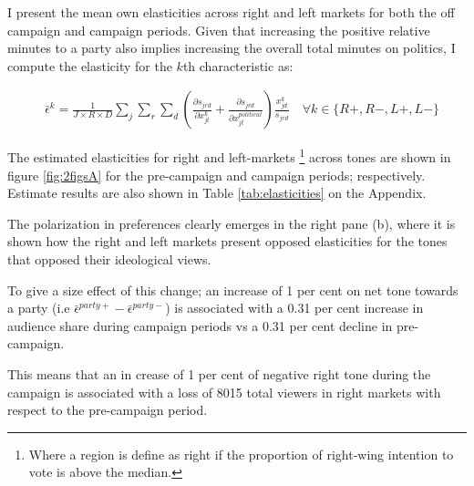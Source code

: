 \documentclass[12pt]{article}
\begin{document}
	I present the mean own elasticities across right and left markets for both the off campaign and campaign periods.  Given that increasing the positive relative minutes to a party also implies increasing the overall total minutes on politics, I compute the elasticity for the $k$th characteristic as: 
	
	\begin{equation}\label{eq:elasticities}
		\begin{aligned}
			& \bar{\epsilon}^k= \frac{1}{J\times R \times D}\sum_{j}\sum_{r} \sum_{d} \left(\frac{\partial s_{jrd}}{\partial x_{jt}^k} +  \frac{\partial s_{jrd}}{\partial x_{jt}^{political}} \right) \frac{x_{jd}^k}{s_{jrd}}    \quad \forall k \in \{R+,R-,L+,L-\}
		\end{aligned}
	\end{equation}             
	
	
The estimated elasticities for right and left-markets \footnote{Where a region is define as right if the proportion of right-wing intention to vote is above the median. } across tones are shown in figure \ref{fig:2figsA} for the pre-campaign and campaign periods; respectively. Estimate results are also shown in Table \ref{tab:elasticities} on the Appendix. 

The polarization in preferences clearly emerges in the right pane (b), where it is shown how the right and left markets present opposed elasticities for the tones that opposed their ideological views. 

To give a size effect of this change; an increase of 1 per cent on net tone towards a party (i.e $ \bar{\epsilon}^{party+}- \bar{\epsilon}^{party-}$) is associated with a 0.31 per cent increase in audience share during campaign periods vs a 0.31 per cent decline in pre-campaign.

This means that an in crease of 1 per cent of negative right tone during the campaign is associated with a loss of 8015 total viewers in right markets with respect to the pre-campaign period. 
\end{document}
